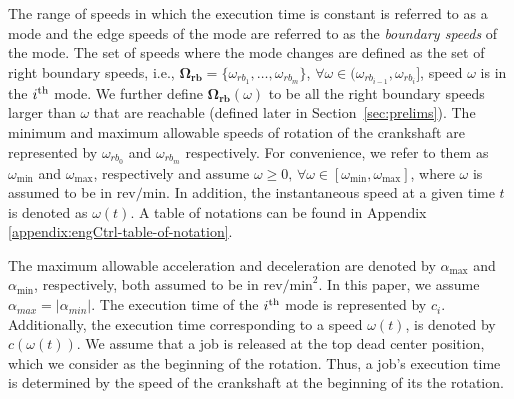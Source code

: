 The range of speeds in which the execution time is constant is referred to as a mode and the edge speeds of the mode are referred to as the \emph{boundary speeds} of the mode.
The set of speeds where the mode changes are defined as the set of right boundary speeds, i.e., $\mathbf{\Omega_{rb}}=\{\omega_{rb_1}, \ldots, \omega_{rb_{m}} \}$, 
$\forall \omega \in (\omega_{rb_{i-1}},\omega_{rb_i}]$, speed $\omega$ is in the $i^{\rm th}$ mode. 
We further define $\mathbf{\Omega_{rb}}(\omega)$ to be all the right boundary speeds larger than $\omega$ that are reachable (defined later in Section~\ref{sec:prelims}). 
The minimum and maximum allowable speeds of rotation of the crankshaft are represented by \(\omega_{rb_0}\) and \(\omega_{rb_m}\) respectively.
 For convenience, we refer to %
them as $\omega_{\min}$ and $\omega_{\max}$, respectively and assume $\omega \geq 0, \, \forall \omega \in [\omega_{\min},\omega_{\max}]$, where $\omega$ is assumed to be in $\text{rev/min}$.
In addition, the instantaneous speed at a given time $t$ is denoted as $\omega(t)$. %
A table of notations can be found in Appendix \ref{appendix:engCtrl-table-of-notation}.

The maximum allowable acceleration and deceleration are denoted by \(\alpha_{\max}\) and \(\alpha_{\min}\), respectively, both assumed to be in $\text{rev/min}^2$.
In this paper, we assume $\alpha_{max}=|\alpha_{min}|$.
The execution time of the $i^{\rm th}$ mode is represented by $c_i$.
Additionally, the execution time corresponding to a speed $\omega(t)$, is denoted by $c(\omega(t))$.
We assume that a job is released at the top dead center position, which we consider as the beginning of the rotation.
Thus, a job's execution time is determined by the speed of the crankshaft at the beginning of its the rotation.

